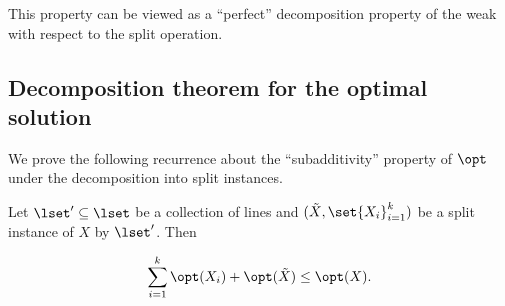 This property can be viewed as a ``perfect'' decomposition property of the weak \WBone with respect to the split operation. 
%







\subsection{Decomposition theorem for the optimal solution}
\label{sec:decompose opt}  

We prove the following recurrence about the ``subadditivity'' property of $\opt$ under the decomposition into split instances. 
%

\begin{theorem}
        \label{thm: opt decomposes} 
Let $\lset' \subseteq \lset$ be a collection of lines and $(\tilde{X}, \set{X_i}_{i=1}^k)$ be a split instance of $X$ by $\lset'$. Then 
%
        
         $$\sum_{i =1}^k\opt(X_i) + \opt(\tilde{X}) \leq \opt(X).$$
\end{theorem}

